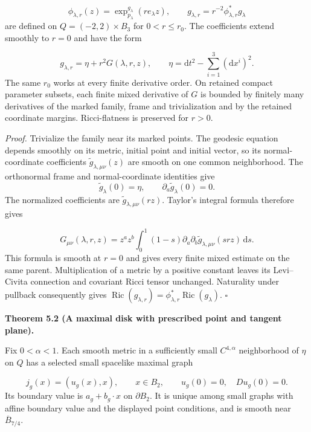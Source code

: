 \documentclass[
  english,
  11pt,
  reqno]{amsart}
\makeatletter
\newcommand{\pandocstatementheading}[1]{%
  \par\addpenalty{\@beginparpenalty}%
  \addvspace{.5\baselineskip plus .2\baselineskip minus .2\baselineskip}%
  {\normalfont\bfseries #1\par}%
  \nobreak\@afterindenttrue\@afterheading
}
\makeatother
\begin{document}
\label{eq:submission-normalized-metric} \[
\phi_{\lambda,r}(z)
=
\exp^{g_\lambda}_{p_\lambda}(r e_\lambda z),
\qquad
g_{\lambda,r}
=
r^{-2}\phi_{\lambda,r}^*g_\lambda
\] are defined on \(Q=(-2,2)\times B_3\) for \(0<r\le r_0\). The
coefficients extend smoothly to \(r=0\) and have the form

\label{eq:submission-normalized-metric-remainder} \[
g_{\lambda,r}
=
\eta+r^2G(\lambda,r,z),
\qquad
\eta=\mathrm dt^2-\sum_{i=1}^3(\mathrm dx^i)^2.
\] The same \(r_0\) works at every finite derivative order. On retained
compact parameter subsets, each finite mixed derivative of \(G\) is
bounded by finitely many derivatives of the marked family, frame and
trivialization and by the retained coordinate margins. Ricci-flatness is
preserved for \(r>0\).

\emph{Proof.} Trivialize the family near its marked points. The geodesic
equation depends smoothly on its metric, initial point and initial
vector, so its normal-coordinate coefficients
\(\widetilde g_{\lambda,\mu\nu}(z)\) are smooth on one common
neighborhood. The orthonormal frame and normal-coordinate identities
give \[
\widetilde g_\lambda(0)=\eta,
\qquad
\partial_a\widetilde g_\lambda(0)=0.
\] The normalized coefficients are
\(\widetilde g_{\lambda,\mu\nu}(rz)\). Taylor's integral formula
therefore gives

\label{eq:submission-normal-coordinate-integral} \[
G_{\mu\nu}(\lambda,r,z)
=
z^az^b\int_0^1(1-s)
\partial_a\partial_b\widetilde g_{\lambda,\mu\nu}(srz)\,\mathrm ds.
\] This formula is smooth at \(r=0\) and gives every finite mixed
estimate on the same parent. Multiplication of a metric by a positive
constant leaves its Levi--Civita connection and covariant Ricci tensor
unchanged. Naturality under pullback consequently gives
\(\operatorname{Ric}(g_{\lambda,r})=\phi_{\lambda,r}^*\operatorname{Ric}(g_\lambda)\).
\hfill\(\square\)

\pandocstatementheading{\leavevmode{}\label{thm:submission-marked-maximal-disk}Theorem 5.2 (A maximal disk with prescribed point and tangent plane).}

Fix \(0<\alpha<1\). Each smooth metric in a sufficiently small
\(C^{4,\alpha}\) neighborhood of \(\eta\) on \(Q\) has a selected small
spacelike maximal graph

\label{eq:submission-marked-maximal-graph} \[
j_g(x)=(u_g(x),x),
\qquad
x\in B_2,
\qquad
u_g(0)=0,\quad Du_g(0)=0.
\] Its boundary value is \(a_g+b_g\cdot x\) on \(\partial B_2\). It is
unique among small graphs with affine boundary value and the displayed
point conditions, and is smooth near \(\overline B_{7/4}\).
\end{document}
